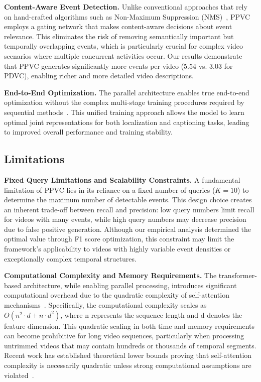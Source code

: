 \textbf{Content-Aware Event Detection.}
Unlike conventional approaches that rely on hand-crafted algorithms such as Non-Maximum Suppression (NMS)~\cite{hosang2017learning}, PPVC employs a gating network that makes content-aware decisions about event relevance. This eliminates the risk of removing semantically important but temporally overlapping events, which is particularly crucial for complex video scenarios where multiple concurrent activities occur. Our results demonstrate that PPVC generates significantly more events per video (5.54 vs. 3.03 for PDVC), enabling richer and more detailed video descriptions.

\textbf{End-to-End Optimization.}
The parallel architecture enables true end-to-end optimization without the complex multi-stage training procedures required by sequential methods~\cite{Zhou2018-zu}. This unified training approach allows the model to learn optimal joint representations for both localization and captioning tasks, leading to improved overall performance and training stability.

\subsection{Limitations}
\textbf{Fixed Query Limitations and Scalability Constraints.}
A fundamental limitation of PPVC lies in its reliance on a fixed number of queries ($K=10$) to determine the maximum number of detectable events.
This design choice creates an inherent trade-off between recall and precision: low query numbers limit recall for videos with many events, while high query numbers may decrease precision due to false positive generation. Although our empirical analysis determined the optimal value through F1 score optimization, this constraint may limit the framework's applicability to videos with highly variable event densities or exceptionally complex temporal structures.

\textbf{Computational Complexity and Memory Requirements.}
The transformer-based architecture, while enabling parallel processing, introduces significant computational overhead due to the quadratic complexity of self-attention mechanisms~\cite{Vaswani2017-sc}. Specifically, the computational complexity scales as $O(n^2 \cdot d + n \cdot d^2)$, where n represents the sequence length and d denotes the feature dimension.
This quadratic scaling in both time and memory requirements can become prohibitive for long video sequences, particularly when processing untrimmed videos that may contain hundreds or thousands of temporal segments. Recent work has established theoretical lower bounds proving that self-attention complexity is necessarily quadratic unless strong computational assumptions are violated~\cite{duman2023computational}.

